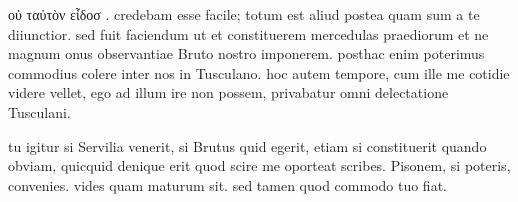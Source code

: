 


 οὐ ταὐτὸν εἶδοσ . credebam esse facile; totum est aliud postea quam sum a te diiunctior. sed fuit faciendum ut et constituerem mercedulas praediorum et ne magnum onus observantiae Bruto nostro imponerem. posthac enim poterimus commodius colere inter nos in Tusculano. hoc autem tempore, cum ille me cotidie videre vellet, ego ad illum ire non possem, privabatur omni delectatione Tusculani.

 tu igitur si Servilia venerit, si Brutus quid egerit, etiam si constituerit quando obviam, quicquid denique erit quod scire me oporteat scribes. Pisonem, si poteris, convenies. vides quam maturum sit. sed tamen quod commodo tuo fiat.
